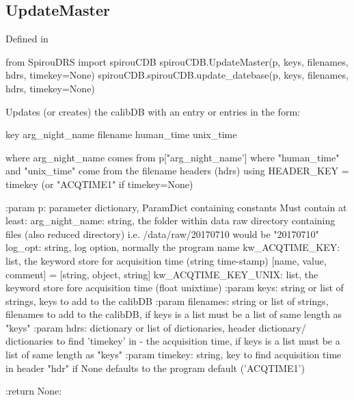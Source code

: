 \noindent\begin{minipage}{\textwidth}
\subsection{UpdateMaster}

Defined in \spirouCDB{}

\begin{pythonbox}
from SpirouDRS import spirouCDB
spirouCDB.UpdateMaster(p, keys, filenames, hdrs, timekey=None)
spirouCDB.spirouCDB.update_datebase(p, keys, filenames, hdrs, timekey=None)
\end{pythonbox}

\begin{pythondocstring}
Updates (or creates) the calibDB with an entry or entries in the form:

    {key} {arg_night_name} {filename} {human_time} {unix_time}

where arg_night_name comes from p["arg_night_name']
where "human_time" and "unix_time" come from the filename headers (hdrs)
    using HEADER_KEY = timekey (or "ACQTIME1" if timekey=None)

:param p: parameter dictionary, ParamDict containing constants
    Must contain at least:
            arg_night_name: string, the folder within data raw directory
                            containing files (also reduced directory) i.e.
                            /data/raw/20170710 would be "20170710"
            log_opt: string, log option, normally the program name
            kw_ACQTIME_KEY: list, the keyword store for acquisition time
                            (string time-stamp)
                        [name, value, comment] = [string, object, string]
            kw_ACQTIME_KEY_UNIX: list, the keyword store fore acquisition
                                 time (float unixtime)
:param keys: string or list of strings, keys to add to the calibDB
:param filenames: string or list of strings, filenames to add to the
                  calibDB, if keys is a list must be a list of same length
                  as "keys"
:param hdrs: dictionary or list of dictionaries, header dictionary/
             dictionaries to find 'timekey' in - the acquisition time,
             if keys is a list must be a list of same length  as "keys"
:param timekey: string, key to find acquisition time in header "hdr" if
                None defaults to the program default ('ACQTIME1')

:return None:
\end{pythondocstring}
\end{minipage}

